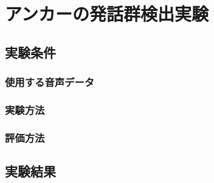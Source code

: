 
\chapter{アンカーの発話群検出実験}
\section{実験条件}
\subsection{使用する音声データ}
\subsection{実験方法}
\subsection{評価方法}
\section{実験結果}
